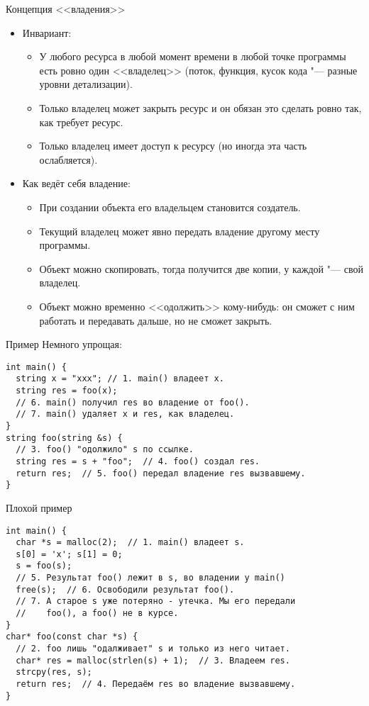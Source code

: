 \begin{frame}[t]{Концепция <<владения>>}
	\begin{itemize}
		\item Инвариант:
			\begin{itemize}
				\item
					У любого ресурса в любой момент времени в любой точке программы есть ровно один <<владелец>>
					(поток, функция, кусок кода "--- разные уровни детализации).
				\item Только владелец может закрыть ресурс и он обязан это сделать ровно так, как требует ресурс.
				\item Только владелец имеет доступ к ресурсу (но иногда эта часть ослабляется).
			\end{itemize}
		\item Как ведёт себя владение:
			\begin{itemize}
				\item При создании объекта его владельцем становится создатель.
				\item Текущий владелец может явно передать владение другому месту программы.
				\item Объект можно скопировать, тогда получится две копии, у каждой "--- свой владелец.
				\item Объект можно временно <<одолжить>> кому-нибудь: он сможет с ним работать и передавать дальше, но не сможет закрыть.
			\end{itemize}
	\end{itemize}
\end{frame}

\begin{frame}[t,fragile]{Пример}
	Немного упрощая:
\begin{verbatim}
int main() {
  string x = "xxx"; // 1. main() владеет x.
  string res = foo(x);
  // 6. main() получил res во владение от foo().
  // 7. main() удаляет x и res, как владелец.
}
string foo(string &s) {
  // 3. foo() "одолжило" s по ссылке.
  string res = s + "foo";  // 4. foo() создал res.
  return res;  // 5. foo() передал владение res вызвавшему.
}
\end{verbatim}
\end{frame}

\begin{frame}[t,fragile]{Плохой пример}
\begin{verbatim}
int main() {
  char *s = malloc(2);  // 1. main() владеет s.
  s[0] = 'x'; s[1] = 0;
  s = foo(s);
  // 5. Результат foo() лежит в s, во владении у main()
  free(s);  // 6. Освободили результат foo().
  // 7. А старое s уже потеряно - утечка. Мы его передали
  //    foo(), а foo() не в курсе.
}
char* foo(const char *s) {
  // 2. foo лишь "одалживает" s и только из него читает.
  char* res = malloc(strlen(s) + 1);  // 3. Владеем res.
  strcpy(res, s);
  return res;  // 4. Передаём res во владение вызвавшему.
}
\end{verbatim}
\end{frame}

